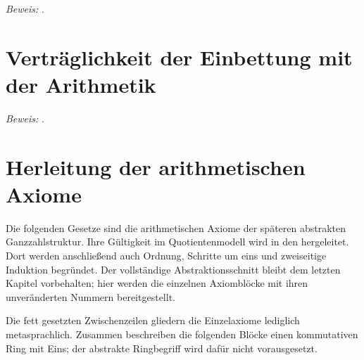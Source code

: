 \documentclass[main.tex]{subfiles}
\begin{document}
\par\noindent\emph{Beweis:} .\par


\section{Verträglichkeit der Einbettung mit der Arithmetik}

\par\noindent\emph{Beweis:} .\par




\section{Herleitung der arithmetischen Axiome}

Die folgenden Gesetze sind die arithmetischen Axiome der späteren
abstrakten Ganzzahlstruktur. Ihre Gültigkeit im Quotientenmodell wird
in den \IntegersProofsLink{} hergeleitet. Dort werden anschließend
auch Ordnung, Schritte um eins und zweiseitige Induktion begründet.
Der vollständige Abstraktionsschnitt bleibt dem letzten Kapitel
vorbehalten; hier werden die einzelnen Axiomblöcke mit ihren
unveränderten Nummern bereitgestellt.

Die fett gesetzten Zwischenzeilen gliedern die Einzelaxiome lediglich
metasprachlich. Zusammen beschreiben die folgenden Blöcke einen kommutativen
Ring mit Eins; der abstrakte Ringbegriff wird dafür nicht vorausgesetzt.
\end{document}
